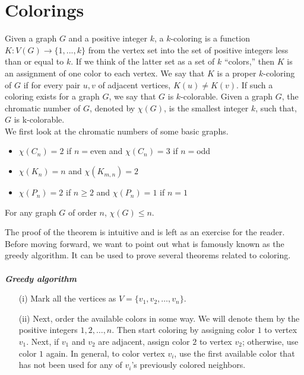 \documentclass[../basic_graph_theory.tex]{subfiles}
\begin{document}
\chapter{Colorings}
\setcounter{chapter}{7} %
\setcounter{section}{0}
\setcounter{equation}{0}
\setcounter{figure}{0}

Given a graph $G$ and a positive integer $k$, a $k$-coloring is a function $K : V (G) \to \{1,...,k\}$ from the vertex set into the set of positive integers less than or equal to $k$. If we think of the latter set as a set of $k$ “colors,” then $K$ is an assignment of one color to each vertex. We say that $K$ is a proper $k$-coloring of $G$ if for every pair $u,v$ of adjacent vertices, $K(u) \neq K(v)$. If such a coloring exists for a graph $G$, we say that $G$ is $k$-colorable. Given a graph $G$, the chromatic number of $G$, denoted by $\chi(G)$, is the smallest integer $k$, such that, $G$ is k-colorable.\\
We first look at the chromatic numbers of some basic graphs.\\
\begin{itemize}
\item $\chi(C_n)=2$ if $n=$even and $\chi(C_n)=3$ if $n=$odd\\
\item $\chi(K_n)=n$ and $\chi(K_{m,n})=2$\\
\item $\chi(P_n)=2$ if $n \ge 2$ and $\chi(P_n)=1$ if $n=1$\\
\end{itemize}

\begin{Thm}{}{}
    For any graph $G$ of order $n$, $\chi(G) \le n$. 
\end{Thm}{}{}
The proof of the theorem is intuitive and is left as an exercise for the reader.\\
Before moving forward, we want to point out what is famously known as the greedy algorithm. It can be used to prove several theorems related to coloring.\\
\\
\textbf{\em{Greedy algorithm}}
\begin{enumerate}
    \item[(i)] Mark all the vertices as $V=\{v_1, v_2, \dots, v_n\}$.
    \item[(ii)] Next, order the available colors in some way. We will denote them by the positive integers $1,2,\dots,n$. Then start coloring by assigning color $1$ to vertex $v_1$. Next, if $v_1$ and $v_2$ are adjacent, assign color $2$ to vertex $v_2$; otherwise, use color $1$ again. In general, to color vertex $v_i$, use the first available color that has not been used for any of $v_i$'s previously colored neighbors.
\end{enumerate}
\end{document}
